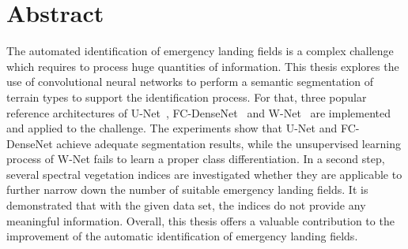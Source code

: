 \section*{Abstract}
The automated identification of emergency landing fields is a complex challenge which requires to process huge quantities of information. This thesis explores the use of convolutional neural networks to perform a semantic segmentation of terrain types to support the identification process. For that, three popular reference architectures of U-Net~\cite{unet15}, FC-DenseNet~\cite{denseseg17} and W-Net~\cite{wnet17} are implemented and applied to the challenge. The experiments show that U-Net and FC-DenseNet achieve adequate segmentation results, while the unsupervised learning process of W-Net fails to learn a proper class differentiation. In a second step, several spectral vegetation indices are investigated whether they are applicable to further narrow down the number of suitable emergency landing fields. It is demonstrated that with the given data set, the indices do not provide any meaningful information. Overall, this thesis offers a valuable contribution to the improvement of the automatic identification of emergency landing fields.